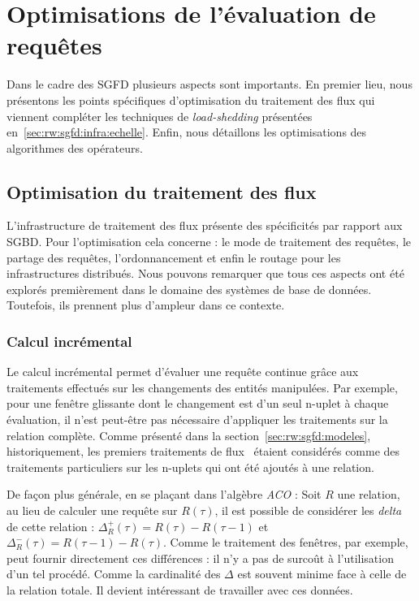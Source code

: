 \section{Optimisations de l'évaluation de requêtes}\label{sec:rw:sgfd:optim}
Dans le cadre des SGFD plusieurs aspects sont importants. En premier lieu, nous présentons les points spécifiques d'optimisation du traitement des flux qui viennent compléter les techniques de \textit{load-shedding} présentées en~\ref{sec:rw:sgfd:infra:echelle}. Enfin, nous détaillons les optimisations des algorithmes des opérateurs.

\subsection{Optimisation du traitement des flux}\label{sec:rw:sgfd:optimisation:flux}
L'infrastructure de traitement des flux présente des spécificités par rapport aux SGBD. Pour l'optimisation cela concerne : le mode de traitement des requêtes, le partage des requêtes, l'ordonnancement et enfin le routage pour les infrastructures distribués. Nous pouvons remarquer que tous ces aspects ont été explorés premièrement dans le domaine des systèmes de base de données. Toutefois, ils prennent plus d'ampleur dans ce contexte.

\subsubsection{Calcul incrémental}
Le calcul incrémental permet d'évaluer une requête continue grâce aux traitements effectués sur les changements des entités manipulées. Par exemple, pour une fenêtre glissante dont le changement est d'un seul n-uplet à chaque évaluation, il n'est peut-être pas nécessaire d'appliquer les traitements sur la relation complète. Comme présenté dans la section~\ref{sec:rw:sgfd:modeles}, historiquement, les premiers traitements de flux~\cite{Terry:tapestry} étaient considérés comme des traitements particuliers sur les n-uplets qui ont été ajoutés à une relation.

De façon plus générale, en se plaçant dans l'algèbre \textit{ACO} : Soit $R$ une relation, au lieu de calculer une requête sur $R(\tau)$, il est possible de considérer les \textit{delta} de cette relation : $\Delta_R^+(\tau) = R(\tau)-R(\tau-1)$ et $\Delta_R^-(\tau) = R(\tau-1)-R(\tau)$. Comme le traitement des fenêtres, par exemple, peut fournir directement ces différences : il n'y a pas de surcoût à l'utilisation d'un tel procédé. Comme la cardinalité des $\Delta$ est souvent minime face à celle de la relation totale. Il devient intéressant de travailler avec ces données.

